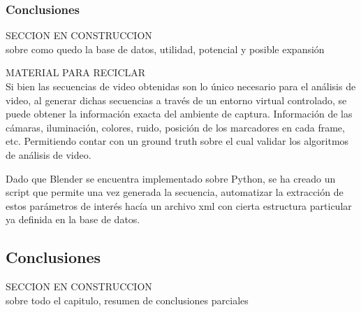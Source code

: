 \subsubsection{Conclusiones} SECCION EN CONSTRUCCION\\
sobre como quedo la base de datos, utilidad, potencial y posible expansión




MATERIAL PARA RECICLAR\\


Si bien las secuencias de video obtenidas son lo único necesario para el análisis de video, al generar dichas secuencias a través de un entorno virtual controlado, se puede obtener la información exacta del ambiente de captura. Información de las cámaras, iluminación, colores, ruido, posición de los marcadores en cada frame, etc. Permitiendo contar con un ground truth sobre el cual validar los algoritmos de análisis de video. 

Dado que Blender se encuentra implementado sobre Python, se ha creado un script que permite una vez generada la secuencia, automatizar la extracción de estos parámetros de interés hacía un archivo xml con cierta estructura particular ya definida en la base de datos. 
 


\subsection{Conclusiones} SECCION EN CONSTRUCCION\\
sobre todo el capitulo, resumen de conclusiones parciales


